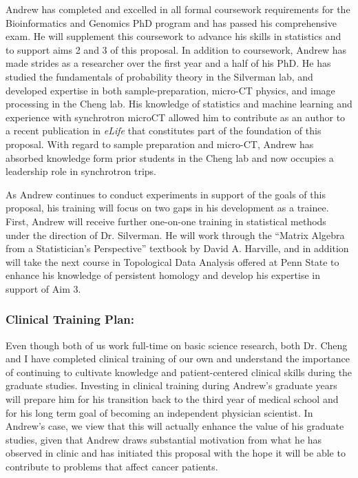 \documentclass{NIHGrant}
\begin{document}
Andrew has completed and excelled in all formal coursework requirements for the Bioinformatics and Genomics PhD program and has passed his comprehensive exam. He will supplement this coursework to advance his skills in statistics and to support aims 2 and 3 of this proposal. In addition to coursework, Andrew has made strides as a researcher over the first year and a half of his PhD. He has studied the fundamentals of probability theory in the Silverman lab, and developed expertise in both sample-preparation, micro-CT physics, and image processing in the Cheng lab. His knowledge of statistics and machine learning and experience with synchrotron microCT allowed him to contribute as an author to a recent publication in \textit{eLife} that constitutes part of the foundation of this proposal. With regard to sample preparation and micro-CT, Andrew has absorbed knowledge form prior students in the Cheng lab and now occupies a leadership role in synchrotron trips. 

As Andrew continues to conduct experiments in support of the goals of this proposal, his training will focus on two gaps in his development as a trainee. First, Andrew will receive further one-on-one training in statistical methods under the direction of Dr. Silverman. He will work through the ``Matrix Algebra from a Statistician's Perspective'' textbook by David A. Harville, and in addition will take the next course in Topological Data Analysis offered at Penn State to enhance his knowledge of persistent homology and develop his expertise in support of Aim 3.

\subsubsection*{Clinical Training Plan: }
Even though both of us work full-time on basic science research, both Dr. Cheng and I have completed clinical training of our own and understand the importance of continuing to cultivate knowledge and patient-centered clinical skills during the graduate studies. Investing in clinical training during Andrew's graduate years will prepare him for his transition back to the third year of medical school and for his long term goal of becoming an independent physician scientist. In Andrew's case, we view that this will actually enhance the value of his graduate studies, given that Andrew draws substantial motivation from what he has observed in clinic and has initiated this proposal with the hope it will be able to contribute to problems that affect cancer patients.
\end{document}
